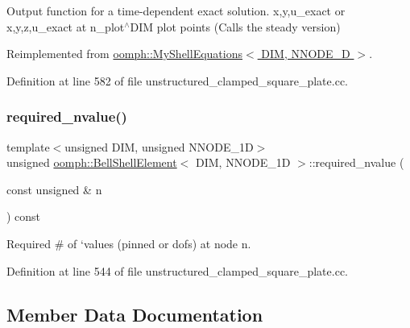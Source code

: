 Output function for a time-\/dependent exact solution. x,y,u\+\_\+exact or x,y,z,u\+\_\+exact at n\+\_\+plot$^\wedge$\+D\+IM plot points (Calls the steady version) 



Reimplemented from \hyperlink{classoomph_1_1MyShellEquations_a7022e91eaf4bff9044e46549bbe0c3f5}{oomph\+::\+My\+Shell\+Equations$<$ D\+I\+M, N\+N\+O\+D\+E\+\_\+D $>$}.



Definition at line 582 of file unstructured\+\_\+clamped\+\_\+square\+\_\+plate.\+cc.

\mbox{\label{classoomph_1_1BellShellElement_aea6c22273ebe4a34111846313716fb0f}} 
\subsubsection{\texorpdfstring{required\+\_\+nvalue()}{required\_nvalue()}}
{\footnotesize\ttfamily template$<$unsigned D\+IM, unsigned N\+N\+O\+D\+E\+\_\+1D$>$ \\
unsigned \hyperlink{classoomph_1_1BellShellElement}{oomph\+::\+Bell\+Shell\+Element}$<$ D\+IM, N\+N\+O\+D\+E\+\_\+1D $>$\+::required\+\_\+nvalue (\begin{DoxyParamCaption}\item[{const unsigned \&}]{n }\end{DoxyParamCaption}) const\hspace{0.3cm}{\ttfamily [inline]}}



Required \# of `values\textquotesingle{} (pinned or dofs) at node n. 



Definition at line 544 of file unstructured\+\_\+clamped\+\_\+square\+\_\+plate.\+cc.



\subsection{Member Data Documentation}
\mbox{\label{classoomph_1_1BellShellElement_a85143ad34e170cb267211069ee7e334f}} 
